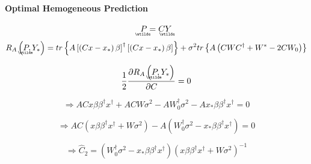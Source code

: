 \documentclass{article}
\begin{document}
\paragraph{Optimal Hemogeneous Prediction}

\begin{equation*}
\underaccent{\wtilde}{P}%
=C%
\underaccent{\wtilde}{Y}%
\end{equation*}%
\begin{equation*}
R_{A}\left( 
\underaccent{\wtilde}{P}%
,Y_{\ast }\right) =tr\left\{ A\left[ \left( Cx-x_{\ast }\right) \beta \right]
^{\dagger }\left[ \left( Cx-x_{\ast }\right) \beta \right] \right\} +\sigma
^{2}tr\left\{ A\left( CWC^{\dagger }+W^{\ast }-2CW_{0}\right) \right\}
\end{equation*}

\begin{equation*}
\frac{1}{2}\frac{\partial R_{A}\left( 
\underaccent{\wtilde}{P}%
,Y_{\ast }\right) }{\partial C}=0
\end{equation*}

\begin{equation*}
\Rightarrow ACx\beta \beta ^{\dagger }x^{\dagger }+ACW\sigma
^{2}-AW_{0}^{\dagger }\sigma ^{2}-Ax_{\ast }\beta \beta ^{\dagger
}x^{\dagger }=0
\end{equation*}

\begin{equation*}
\Rightarrow AC\left( x\beta \beta ^{\dagger }x^{\dagger }+W\sigma
^{2}\right) -A\left( W_{0}^{\dagger }\sigma ^{2}-x_{\ast }\beta \beta
^{\dagger }x^{\dagger }\right) =0
\end{equation*}

\begin{equation*}
\Rightarrow \hat{C}_{2}=\left( W_{0}^{\dagger }\sigma ^{2}-x_{\ast }\beta
\beta ^{\dagger }x^{\dagger }\right) \left( x\beta \beta ^{\dagger
}x^{\dagger }+W\sigma ^{2}\right) ^{-1}
\end{equation*}
\end{document}
